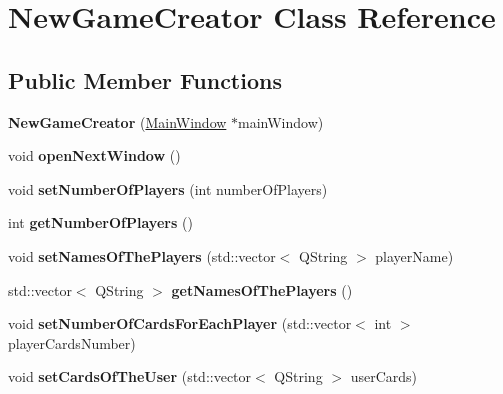 \hypertarget{classNewGameCreator}{}\section{New\+Game\+Creator Class Reference}
\label{classNewGameCreator}
\subsection*{Public Member Functions}
\begin{DoxyCompactItemize}
\item 
\mbox{\label{classNewGameCreator_a30b53bdda90bbf9f9ce8183e6e475274}} 
{\bfseries New\+Game\+Creator} (\hyperlink{classMainWindow}{Main\+Window} $\ast$main\+Window)
\item 
\mbox{\label{classNewGameCreator_aa3cc740c81a3264a352a9cac2a2c60eb}} 
void {\bfseries open\+Next\+Window} ()
\item 
\mbox{\label{classNewGameCreator_a6118892cee025ca10e05741387ce999c}} 
void {\bfseries set\+Number\+Of\+Players} (int number\+Of\+Players)
\item 
\mbox{\label{classNewGameCreator_acc48dac51f9b7cf2b2b6793f321ce144}} 
int {\bfseries get\+Number\+Of\+Players} ()
\item 
\mbox{\label{classNewGameCreator_a753d5ed531a6d57ed1418a696c66ddb2}} 
void {\bfseries set\+Names\+Of\+The\+Players} (std\+::vector$<$ Q\+String $>$ player\+Name)
\item 
\mbox{\label{classNewGameCreator_a1aac05c21a10a7e4709c831ac6e56b91}} 
std\+::vector$<$ Q\+String $>$ {\bfseries get\+Names\+Of\+The\+Players} ()
\item 
\mbox{\label{classNewGameCreator_abff5d40e11ad39ab4356af6717d88e83}} 
void {\bfseries set\+Number\+Of\+Cards\+For\+Each\+Player} (std\+::vector$<$ int $>$ player\+Cards\+Number)
\item 
\mbox{\label{classNewGameCreator_a14244649f919d6946d33c518932105f3}} 
void {\bfseries set\+Cards\+Of\+The\+User} (std\+::vector$<$ Q\+String $>$ user\+Cards)

\end{DoxyCompactItemize}
